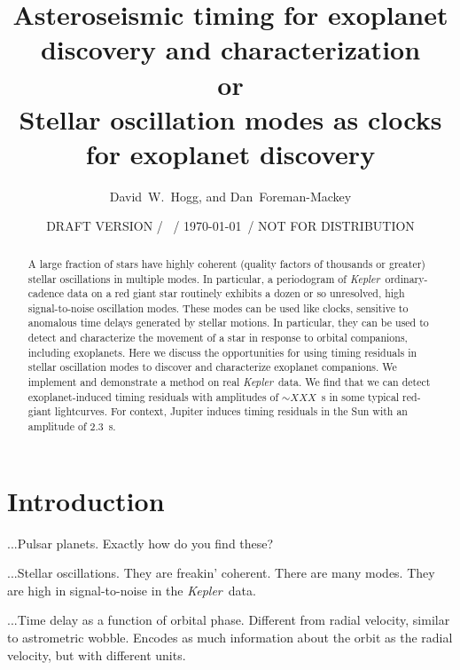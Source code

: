 \documentclass[12pt, preprint]{aastex}
\newcounter{affil}
\newcommand{\project}[1]{\textsl{#1}}
\newcommand{\Kepler}{\project{Kepler}}
\begin{document}
\title{
  Asteroseismic timing for exoplanet discovery and characterization
  \\ or \\
  Stellar oscillation modes as clocks for exoplanet discovery
}
\author{
  David~W.~Hogg\altaffilmark{\ref{ccpp},\ref{cds},\ref{mpia},\ref{email}},
  and
  Dan~Foreman-Mackey\altaffilmark{\ref{ccpp}}
}
\date{DRAFT VERSION / \texttt{\githash}\ / \today\ / NOT FOR DISTRIBUTION}
\label{ccpp}
\label{cds}
\label{mpia}
\label{email}

\begin{abstract}
A large fraction of stars have highly coherent (quality factors of
thousands or greater) stellar oscillations in multiple modes.
In particular, a periodogram of \Kepler\ ordinary-cadence data on a
red giant star routinely exhibits a dozen or so unresolved, high
signal-to-noise oscillation modes.
These modes can be used like clocks, sensitive to anomalous time
delays generated by stellar motions.
In particular, they can be used to detect and characterize the
movement of a star in response to orbital companions, including
exoplanets.
Here we discuss the opportunities for using timing residuals in
stellar oscillation modes to discover and characterize exoplanet
companions.
We implement and demonstrate a method on real \Kepler\ data.
We find that we can detect exoplanet-induced timing residuals with
amplitudes of $\sim XXX$~s in some typical red-giant lightcurves.
For context, Jupiter induces timing residuals in the Sun with an
amplitude of 2.3~s.
\end{abstract}

\section{Introduction}

...Pulsar planets.  Exactly how do you find these?

...Stellar oscillations.  They are freakin' coherent.  There are many
modes.  They are high in signal-to-noise in the \Kepler\ data.

...Time delay as a function of orbital phase.  Different from radial
velocity, similar to astrometric wobble.  Encodes as much information
about the orbit as the radial velocity, but with different units.
\end{document}
